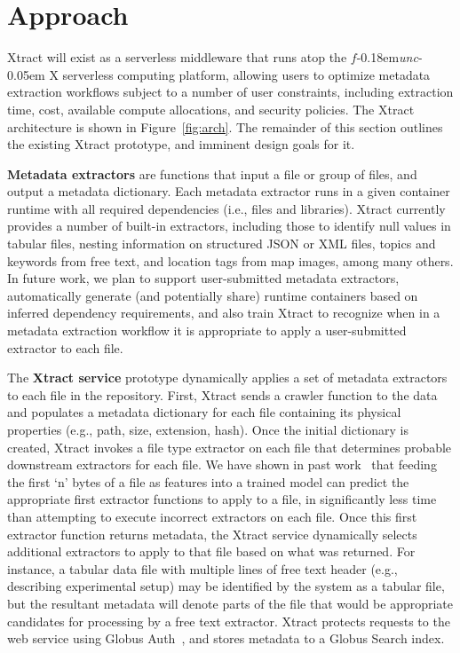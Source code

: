 \documentclass[sigconf, 9pt]{acmart}
\newcommand{\name}{Xtract}
\newcommand{\funcx}{$f$\kern-0.18em\emph{unc}\kern-0.05em X}
\begin{document}
\section{Approach}
\label{sec:approach}

\name{} will exist as a serverless middleware that runs atop the \funcx{} serverless 
computing platform, allowing users to optimize metadata extraction workflows subject to 
a number of user constraints, including extraction time, cost, available compute allocations, and security policies.
The \name{} architecture is shown in Figure~\ref{fig:arch}.
The remainder 
of this section outlines the existing \name{} prototype, and imminent design goals for it.  

\textbf{Metadata extractors} are functions that input a file or group of files, and output a metadata dictionary. 
Each metadata extractor runs in a given container runtime with all required dependencies (i.e., files and 
libraries).  \name{} currently provides a number of built-in extractors, including
those to identify null values in tabular files, nesting information on structured JSON or XML files, topics and keywords from free text, and location tags from map images, 
among many others. In future work, 
we plan to support user-submitted metadata extractors, automatically generate (and potentially share) runtime containers based on inferred 
dependency requirements, and also train \name{} to recognize when in a metadata extraction workflow it is appropriate to apply a user-submitted extractor 
to each file. 

The \textbf{\name{} service} prototype dynamically applies a set of metadata extractors to each file in the repository. 
First, \name{} sends a crawler function to the data and populates a metadata dictionary for each file containing
its physical properties (e.g., path, size, extension, hash).  Once the initial dictionary is created, \name{} invokes a file type extractor on each 
file that determines probable downstream extractors for each file. We have shown in past work~\cite{skluzacek2018skluma} that feeding 
the first `n' bytes of a file as features into 
a trained model can predict the appropriate first extractor functions to apply to a file, in significantly less time
than attempting to execute incorrect extractors on each file. Once this first extractor function returns metadata, the \name{} service dynamically selects additional extractors to apply to 
that file based on what was returned.  For instance, 
a tabular data file with multiple lines of free text header (e.g., describing experimental setup) may be identified by the system as a tabular file, but 
the resultant metadata will denote parts of the file that would be appropriate candidates for processing by a free text extractor.
\name{} protects requests to the web service using Globus Auth~\cite{tuecke2016globus}, and stores metadata to a Globus Search index. 
\end{document}
